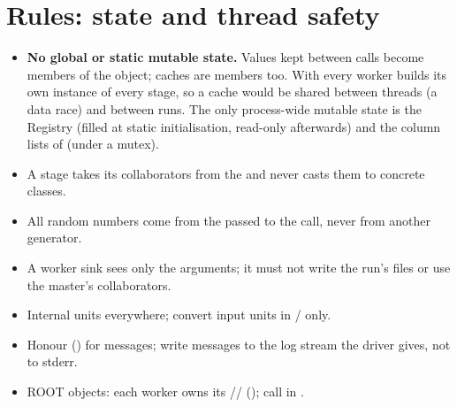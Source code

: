 \section{\texorpdfstring{Rules: state and thread safety}{Rules: state and thread safety}}\label{developer_manual-04u5fextending:47-rules-state-and-thread-safety}
\begin{itemize}
\item \textbf{No global or static mutable state.} Values kept between calls become members of the object; caches
are members too. With  every worker builds its own instance of every stage, so a  cache would be
shared between threads (a data race) and between runs. The only process-wide mutable state is the Registry (filled at
static initialisation,\allowbreak{} read-only afterwards) and the column lists of  (under a mutex).
\item A stage takes its collaborators from the  and never casts them to concrete classes.
\item All random numbers come from the  passed to the call, never from another generator.
\item A worker sink sees only the  arguments; it must not write the run's files or use the master's collaborators.
\item Internal units everywhere; convert input units in / only.
\item Honour  () for messages; write messages to the log stream the driver gives, not to stderr.
\item ROOT objects: each worker owns its // (); call
 in .
\end{itemize}
